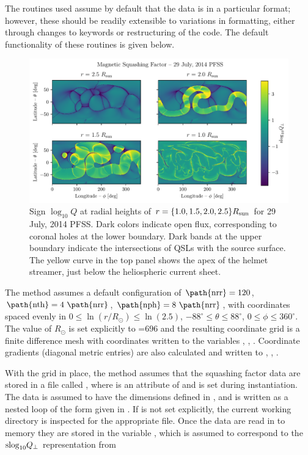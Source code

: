 \documentclass[10pt]{aastex62}
\begin{document}
\begin{itemize}
The routines used assume by default that the data is in a particular format; however, these should be readily extensible to variations in formatting, either through changes to keywords or restructuring of the code.
The default functionality of these routines is given below.

\begin{figure}
\center
\includegraphics[width=\linewidth]{./fig_src_fls/140729_slog10q_multi.pdf}
\caption{Sign $\log_{10} Q$ at radial heights of $r = \{1.0, 1.5, 2.0, 2.5\} R_{\rm sun}$ for 29 July, 2014 PFSS. Dark colors indicate open flux, corresponding to coronal holes at the lower boundary. Dark bands at the upper boundary indicate the intersections of QSLs with the source surface. The yellow curve in the top panel shows the apex of the helmet streamer, just below the heliospheric current sheet.}
\label{slog10q_multi.fig}
\end{figure}

The  method assumes a default configuration of $\text{\path{nrr}}=120$, $\text{\path{nth}}=4~\text{\path{nrr}}$, $\text{\path{nph}}=8~\text{\path{nrr}}$, with coordinates spaced evenly in $0 \le \ln(r / R_\odot) \le \ln(2.5)$, $-88^\circ \le \theta \le 88^\circ$, $0 \le \phi \le 360^\circ$.  
The value of $R_\odot$ is set explicitly to =$696$ and the resulting coordinate grid is a finite difference mesh with coordinates written to the variables , , . 
Coordinate gradients (diagonal metric entries) are also calculated and written to , , . 

With the grid in place, the  method assumes that the squashing factor data are stored in a file called , where  is an attribute of  and is set during instantiation.
The data is assumed to have the dimensions defined in , and is written as a nested loop of the form given in \cite{Tassev:2016}. 
If  is not set explicitly, the current working directory is inspected for the appropriate file. 
Once the data are read in to memory they are stored in the variable , which is assumed to correspond to the ${\rm slog}_{10} Q_\perp$ representation from \cite{Scott:2018a}


\end{itemize}
\end{document}
